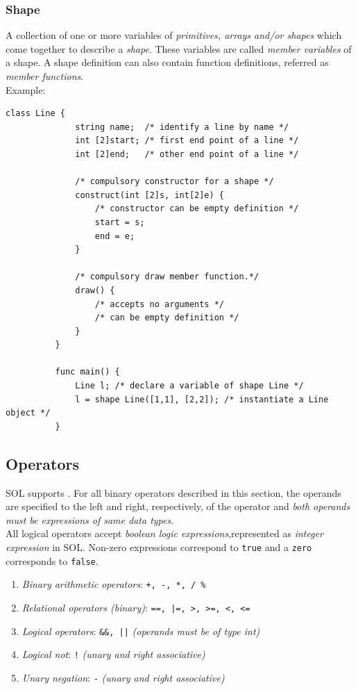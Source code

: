 \documentclass[letterpaper,12pt]{report}
\begin{document}
      \subsubsection{Shape}
        A collection of one or more variables of \textit{primitives, arrays and/or shapes} which come together to describe a \textit{shape}. These variables are called \textit{member variables} of a shape. A shape definition can also contain function definitions, referred as \textit{member functions}.\\
        Example:\\
        \begin{lstlisting}[style=sol]
          class Line {
              string name;  /* identify a line by name */
              int [2]start; /* first end point of a line */
              int [2]end;   /* other end point of a line */

              /* compulsory constructor for a shape */
              construct(int [2]s, int[2]e) {
                  /* constructor can be empty definition */
                  start = s;
                  end = e;
              }

              /* compulsory draw member function.*/
              draw() {
                  /* accepts no arguments */
                  /* can be empty definition */
              }
          }

          func main() {
              Line l; /* declare a variable of shape Line */
              l = shape Line([1,1], [2,2]); /* instantiate a Line object */
          }
        \end{lstlisting}

    \subsection{Operators}
    SOL supports . For all binary operators described in this section, the operands are specified to the left and right, respectively, of the operator and \textit{both operands must be expressions of same data types}.\\
    All logical operators accept \textit{boolean logic expressions},represented as \textit{integer expression} in SOL. Non-zero expressions correspond to \texttt{true} and a \texttt{zero} corresponds to \texttt{false}. 

    \begin{enumerate}
      \itemsep 0em
      \item \textit{Binary arithmetic operators}: \texttt{+, -, *, / \%}
      \item \textit{Relational operators (binary)}: \texttt{==, |=, >, >=, <, <=}
      \item \textit{Logical operators}: \texttt{\&\&, ||} \textit{(operands must be of type int)}
      \item \textit{Logical not}: \texttt{!} \textit{(unary and right associative)}
      \item \textit{Unary negation}: \texttt{-} \textit{(unary and right associative)}
    \end{enumerate}
\end{document}
